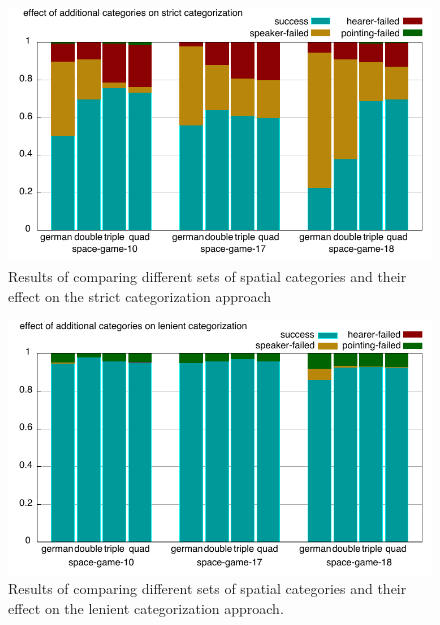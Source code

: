\begin{figure}
	\begin{center}
		\includegraphics[width=.8\columnwidth]{figs/filter-more-categories.pdf}
	\end{center}
	\caption[Effect of additional categories on strict categorization]
	{Results of comparing different sets of spatial categories and their 
		effect on the strict categorization approach}
	\label{f:filter-increased-categories}
\end{figure}
\begin{figure}
	\begin{center}
		\includegraphics[width=.8\columnwidth]{figs/apply-more-categories.pdf}
	\end{center}
	\caption[Effect of additional categories on lenient categorization]
	{Results of comparing different sets of spatial categories and their 
		effect on the lenient categorization approach.}
	\label{f:apply-increased-categories}
\end{figure}

